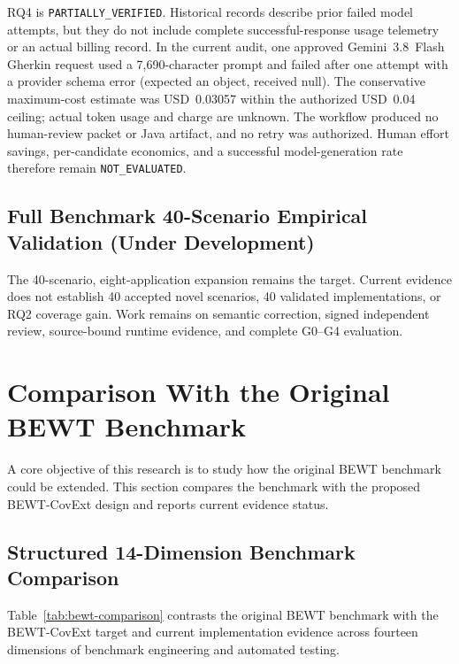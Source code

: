 \documentclass[pdflatex,sn-mathphys-num]{sn-jnl}
\begin{document}
RQ4 is \texttt{PARTIALLY\_VERIFIED}. Historical records describe prior failed model attempts, but they do not include complete successful-response usage telemetry or an actual billing record. In the current audit, one approved Gemini~3.8~Flash Gherkin request used a 7,690-character prompt and failed after one attempt with a provider schema error (expected an object, received null). The conservative maximum-cost estimate was USD~0.03057 within the authorized USD~0.04 ceiling; actual token usage and charge are unknown. The workflow produced no human-review packet or Java artifact, and no retry was authorized. Human effort savings, per-candidate economics, and a successful model-generation rate therefore remain \texttt{NOT\_EVALUATED}.

\subsection{Full Benchmark 40-Scenario Empirical Validation (Under Development)}\label{subsec:full-benchmark-dev}

The 40-scenario, eight-application expansion remains the target. Current evidence does not establish 40 accepted novel scenarios, 40 validated implementations, or RQ2 coverage gain. Work remains on semantic correction, signed independent review, source-bound runtime evidence, and complete G0--G4 evaluation.


\section{Comparison With the Original BEWT Benchmark}\label{sec:comparison}

A core objective of this research is to study how the original BEWT benchmark could be extended. This section compares the benchmark with the proposed BEWT-CovExt design and reports current evidence status.

\subsection{Structured 14-Dimension Benchmark Comparison}

Table~\ref{tab:bewt-comparison} contrasts the original BEWT benchmark with the BEWT-CovExt target and current implementation evidence across fourteen dimensions of benchmark engineering and automated testing.
\end{document}

